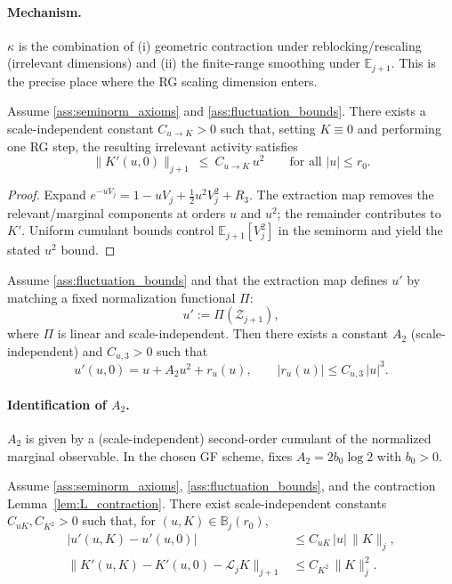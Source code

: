 \paragraph{Mechanism.}
$\kappa$ is the combination of (i) geometric contraction under reblocking/rescaling (irrelevant dimensions) and
(ii) the finite-range smoothing under $\mathbb E_{j+1}$.
This is the precise place where the RG scaling dimension enters.

\begin{lemma}\label{lem:K_from_u}
Assume \ref{ass:seminorm_axioms} and \ref{ass:fluctuation_bounds}.
There exists a scale-independent constant $C_{u\to K}>0$ such that, setting $K\equiv 0$ and performing one RG step,
the resulting irrelevant activity satisfies
\[
\|K'(u,0)\|_{j+1}\ \le\ C_{u\to K}\,u^2
\qquad\text{for all }|u|\le r_0.
\]
\end{lemma}

\begin{proof}
Expand $e^{-uV_j}=1-uV_j+\tfrac12 u^2 V_j^2+R_3$.
The extraction map removes the relevant/marginal components at orders $u$ and $u^2$; the remainder contributes to $K'$.
Uniform cumulant bounds control $\mathbb E_{j+1}[V_j^2]$ in the seminorm and yield the stated $u^2$ bound.
\end{proof}

\begin{lemma}\label{lem:u_flow}
Assume \ref{ass:fluctuation_bounds} and that the extraction map defines $u'$ by matching a fixed normalization functional $\Pi$:
\[
u':=\Pi(\mathcal Z_{j+1}),
\]
where $\Pi$ is linear and scale-independent.
Then there exists a constant $A_2$ (scale-independent) and $C_{u,3}>0$ such that
\[
u'(u,0)=u + A_2 u^2 + r_u(u),
\qquad |r_u(u)|\le C_{u,3}\,|u|^3.
\]
\end{lemma}

\paragraph{Identification of $A_2$.}
$A_2$ is given by a (scale-independent) second-order cumulant of the normalized marginal observable.
In the chosen GF scheme, fixes $A_2=2b_0\log2$ with $b_0>0$.

\begin{lemma}\label{lem:mixed_bounds}
Assume \ref{ass:seminorm_axioms}, \ref{ass:fluctuation_bounds}, and the contraction Lemma~\ref{lem:L_contraction}.
There exist scale-independent constants $C_{uK},C_{K^2}>0$ such that, for $(u,K)\in\mathbb B_j(r_0)$,
\begin{align*}
|u'(u,K)-u'(u,0)|&\le C_{uK}\,|u|\,\|K\|_j,\\
\|K'(u,K)-K'(u,0)-\mathcal L_j K\|_{j+1}&\le C_{K^2}\,\|K\|_j^2.
\end{align*}
\end{lemma}

